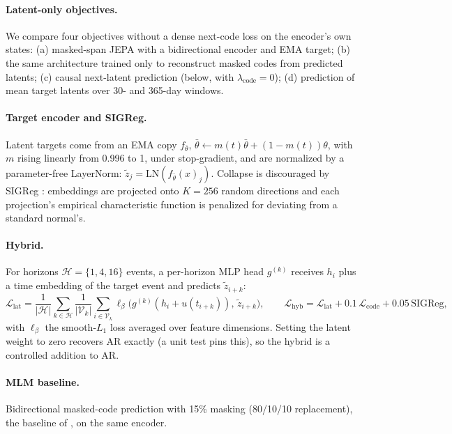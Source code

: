 \documentclass[10pt,letterpaper]{article}
\begin{document}
\paragraph{Latent-only objectives.}
We compare four objectives without a dense next-code loss on the encoder's own states:
(a) masked-span JEPA with a bidirectional encoder and EMA target; (b) the same
architecture trained only to reconstruct masked codes from predicted latents;
(c) causal next-latent prediction (below, with $\lambda_{\mathrm{code}}=0$);
(d) prediction of mean target latents over 30- and 365-day windows.

\paragraph{Target encoder and SIGReg.}
Latent targets come from an EMA copy $f_{\bar\theta}$,
$\bar\theta \leftarrow m(t)\bar\theta + (1-m(t))\theta$, with $m$ rising
linearly from 0.996 to 1, under stop-gradient, and are normalized by a
parameter-free LayerNorm: $\tilde z_j = \mathrm{LN}(f_{\bar\theta}(x)_j)$.
Collapse is discouraged by SIGReg \citep{lejepa}: embeddings are projected onto
$K=256$ random directions and each projection's empirical characteristic function is
penalized for deviating from a standard normal's.

\paragraph{Hybrid.}
For horizons $\mathcal{H}=\{1,4,16\}$ events, a per-horizon MLP head $g^{(k)}$
receives $h_i$ plus a time embedding of the target event and predicts
$\tilde z_{i+k}$:
\begin{equation}
\mathcal{L}_{\mathrm{lat}}=\frac{1}{|\mathcal{H}|}\sum_{k\in\mathcal{H}}
\frac{1}{|\mathcal{V}_k|}\sum_{i\in\mathcal{V}_k}
\ell_\beta\big(g^{(k)}(h_i+u(t_{i+k})),\,\tilde z_{i+k}\big),
\qquad
\mathcal{L}_{\mathrm{hyb}} = \mathcal{L}_{\mathrm{lat}} + 0.1\,\mathcal{L}_{\mathrm{code}} + 0.05\,\mathrm{SIGReg},
\end{equation}
with $\ell_\beta$ the smooth-$L_1$ loss averaged over feature dimensions. Setting the latent
weight to zero recovers AR exactly (a unit test pins this), so the hybrid is a
controlled addition to AR.

\paragraph{MLM baseline.}
Bidirectional masked-code prediction with 15\% masking (80/10/10 replacement),
the baseline of \citet{imperialjepa}, on the same encoder.
\end{document}
